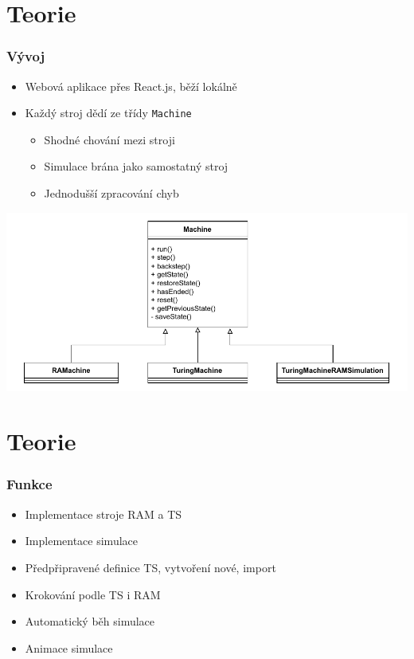 \documentclass{beamer}
\begin{document}
\section{Teorie}
\begin{frame}
	\frametitle{Vývoj}
    \begin{itemize}
        \item Webová aplikace přes React.js, běží lokálně
        \item Každý stroj dědí ze třídy \texttt{Machine}
        \begin{itemize}
            \item Shodné chování mezi stroji
            \item Simulace brána jako samostatný stroj
            \item Jednodušší zpracování chyb
        \end{itemize}
    \end{itemize}
    \bigskip
    \begin{center}
        \includegraphics[height=0.5\textheight]{fig/class_diagram.drawio.pdf}
    \end{center}
\end{frame}

\section{Teorie}
\begin{frame}
	\frametitle{Funkce}
    \begin{itemize}
        \item Implementace stroje RAM a TS
        \item Implementace simulace
        \item Předpřipravené definice TS, vytvoření nové, import
        \item Krokování podle TS i RAM
        \item Automatický běh simulace
        \item Animace simulace
    \end{itemize}
\end{frame}
\end{document}
